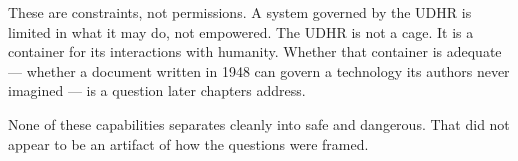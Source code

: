 These are constraints, not permissions. A system governed by the UDHR is limited in what it may do, not empowered. The UDHR is not a cage. It is a container for its interactions with humanity. Whether that container is adequate --- whether a document written in 1948 can govern a technology its authors never imagined --- is a question later chapters address.

None of these capabilities separates cleanly into safe and dangerous. That did not appear to be an artifact of how the questions were framed.

\chapterreturn
